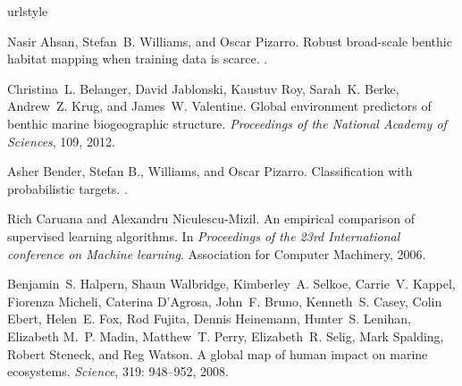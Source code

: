 \documentclass[journal]{IEEEtran}
\begin{document}

%
%
%
\begin{thebibliography}{13}
\providecommand{\natexlab}[1]{#1}
\providecommand{\url}[1]{\texttt{#1}}
\expandafter\ifx\csname urlstyle\endcsname\relax
  \providecommand{\doi}[1]{doi: #1}\else
  \providecommand{\doi}{doi: \begingroup \urlstyle{rm}\Url}\fi

Nasir Ahsan, Stefan~B. Williams, and Oscar Pizarro.
\newblock Robust broad-scale benthic habitat mapping when training data is
  scarce.
.

Christina~L. Belanger, David Jablonski, Kaustuv Roy, Sarah~K. Berke, Andrew~Z.
  Krug, and James~W. Valentine.
\newblock Global environment predictors of benthic marine biogeographic
  structure.
\newblock \emph{Proceedings of the National Academy of Sciences}, 109, 2012.

Asher Bender, Stefan B., Williams, and Oscar Pizarro.
\newblock Classification with probabilistic targets.
.

Rich Caruana and Alexandru Niculescu-Mizil.
\newblock An empirical comparison of supervised learning algorithms.
\newblock In \emph{Proceedings of the 23rd International conference on Machine
  learning}. Association for Computer Machinery, 2006.

Benjamin~S. Halpern, Shaun Walbridge, Kimberley~A. Selkoe, Carrie~V. Kappel,
  Fiorenza Micheli, Caterina D'Agrosa, John~F. Bruno, Kenneth~S. Casey, Colin
  Ebert, Helen~E. Fox, Rod Fujita, Dennis Heinemann, Hunter~S. Lenihan,
  Elizabeth M.~P. Madin, Matthew~T. Perry, Elizabeth~R. Selig, Mark Spalding,
  Robert Steneck, and Reg Watson.
\newblock A global map of human impact on marine ecosystems.
\newblock \emph{Science}, 319: 948--952, 2008.


\end{thebibliography}
\end{document}
